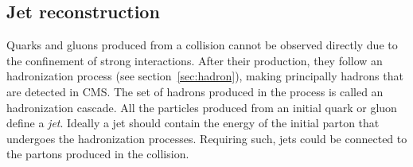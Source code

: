 %
%
%
%

\subsection{Jet reconstruction}
\label{sec:jets}

Quarks and gluons produced from a collision cannot be observed directly due to the confinement of strong interactions. After their production, they follow an hadronization process (see section~\ref{sec:hadron}), making principally hadrons that are detected in CMS. The set of hadrons produced in the process is called an hadronization cascade. All the particles produced from an initial quark or gluon define a \textit{jet}. Ideally a jet should contain the energy of the initial parton that undergoes the hadronization processes. Requiring such, jets could be connected to the partons produced in the collision.

